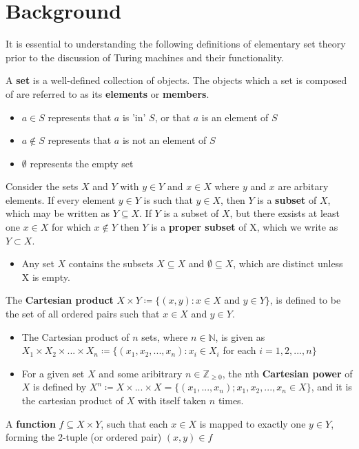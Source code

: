 \documentclass{article}
\begin{document}
\section{Background}
It is essential to understanding the following definitions of elementary set theory prior to the discussion of Turing machines and their functionality.
\begin{defin}
A \textbf{set} is a well-defined collection of objects. The objects which a set is composed of are referred to as its \textbf{elements} or \textbf{members}.
\begin{itemize}
\item $a \in S$ represents that $a$ is 'in' $S$, or that $a$ is an element of $S$
\item $a \notin S$ represents that $a$ is not an element of $S$
\item $\emptyset$ represents the empty set
\end{itemize}
\end{defin}
\begin{defin}
Consider the sets $X$ and $Y$ with $y \in Y$ and $x \in X$ where $y$ and $x$ are arbitary elements. If every element $y \in Y$ is such that $y \in X$, then $Y$ is a \textbf{subset} of $X$, which may be written as $Y\subseteq X$.
If $Y$ is a subset of $X$, but there exsists at least one $x \in X$ for which $x \notin Y$ then $Y$ is a \textbf{proper subset} of X, which we write as $Y \subset X$.
\begin{itemize}
\item Any set $X$ contains the subsets $X \subseteq X$ and $\emptyset \subseteq X$, which are distinct unless X is empty.
\end{itemize}
\end{defin}
\begin{defin}
The \textbf{Cartesian product} $X \times Y \coloneq \{ (x, y): x \in X$ and $y \in Y \}$, is defined to be the set of all ordered pairs such that $x \in X$ and $y \in Y$.
\begin{itemize}
\item The Cartesian product of $n$ sets, where $n \in \mathbb{N}$, is given as
$X_{1}\times X_{2} \times {...} \times X_{n} \coloneq \{( x_{1},x_{2},{...},x_{n}):x_{i}\in X_{i}$ for each $i = 1,2,{...},n\}$
\item For a given set $X$ and some aribitrary $n \in \mathbb{Z}_{\geq 0}$, the nth \textbf{Cartesian power} of $X$ is defined by
$X^{n} \coloneq X \times {...} \times X = \{(x_{1},{...},x_n) ; x_{1},x_{2},{...},x_{n}\in X\}$, and it is the cartesian product of $X$ with itself taken $n$ times.
\end{itemize}
\end{defin}
\begin{defin}
A \textbf{function} $f \subseteq X \times Y$, such that each $x \in X$ is mapped to exactly one $y \in Y$, forming the 2-tuple (or ordered pair) $(x, y) \in f$
\end{defin} \cite{2}
\end{document}
